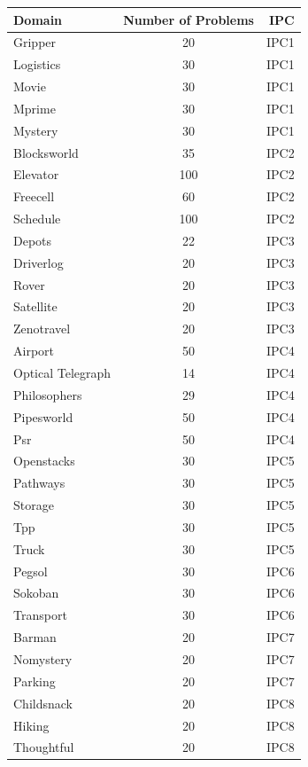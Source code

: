 \begin{center}
  \begin{tabular}{ | l | c | r |}
    \hline
    \textbf{Domain} & \textbf{Number of Problems} & \textbf{IPC} \\ \hline
    Gripper & 20 & IPC1 \\ \hline
    Logistics & 30 & IPC1 \\ \hline
    Movie & 30 & IPC1 \\ \hline
    Mprime & 30 & IPC1 \\ \hline
    Mystery & 30 & IPC1 \\ \hline
    Blocksworld & 35 & IPC2 \\ \hline
    Elevator & 100 & IPC2 \\ \hline
    Freecell & 60 & IPC2 \\ \hline
    Schedule & 100 & IPC2 \\ \hline
    Depots & 22 & IPC3 \\ \hline
    Driverlog & 20 & IPC3 \\ \hline
    Rover & 20 & IPC3 \\ \hline
    Satellite & 20 & IPC3 \\ \hline
    Zenotravel & 20 & IPC3 \\ \hline
    Airport & 50 & IPC4 \\ \hline
    Optical Telegraph & 14 & IPC4 \\ \hline
    Philosophers & 29 & IPC4 \\ \hline
    Pipesworld & 50 & IPC4 \\ \hline
    Psr & 50 & IPC4 \\ \hline
    Openstacks & 30 & IPC5 \\ \hline
    Pathways & 30 & IPC5 \\ \hline
    Storage & 30 & IPC5 \\ \hline
    Tpp & 30 & IPC5 \\ \hline
    Truck & 30 & IPC5 \\ \hline
    Pegsol & 30 & IPC6 \\ \hline
    Sokoban & 30 & IPC6 \\ \hline
    Transport & 30 & IPC6 \\ \hline
    Barman & 20 & IPC7 \\ \hline
    Nomystery & 20 & IPC7 \\ \hline
    Parking & 20 & IPC7 \\ \hline
    Childsnack & 20 & IPC8 \\ \hline
    Hiking & 20 & IPC8 \\ \hline
    Thoughtful & 20 & IPC8 \\
    \hline
  \end{tabular}
\end{center}
